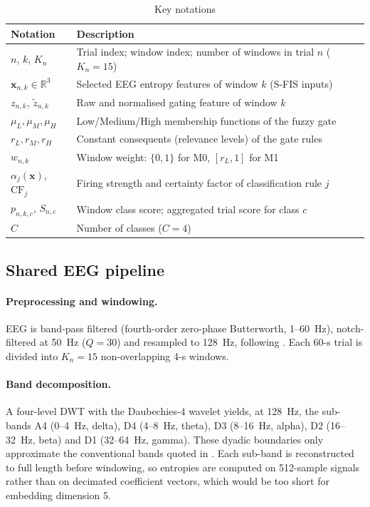 \documentclass[11pt,a4paper]{article}
\begin{document}
\begin{table}[t]
\centering\small
\caption{Key notations}\label{tab:notation}
\begin{tabular}{@{}ll@{}}
\toprule
Notation & Description\\
\midrule
$n$, $k$, $K_n$ & Trial index; window index; number of windows in trial $n$ ($K_n=15$)\\
$\mathbf{x}_{n,k}\in\mathbb{R}^{3}$ & Selected EEG entropy features of window $k$ (S-FIS inputs)\\
$z_{n,k}$, $\tilde z_{n,k}$ & Raw and normalised gating feature of window $k$\\
$\mu_{L},\mu_{M},\mu_{H}$ & Low/Medium/High membership functions of the fuzzy gate\\
$r_{L},r_{M},r_{H}$ & Constant consequents (relevance levels) of the gate rules\\
$w_{n,k}$ & Window weight: $\{0,1\}$ for M0, $[r_L,1]$ for M1\\
$\alpha_j(\mathbf{x})$, $\mathrm{CF}_j$ & Firing strength and certainty factor of classification rule $j$\\
$p_{n,k,c}$, $S_{n,c}$ & Window class score; aggregated trial score for class $c$\\
$C$ & Number of classes ($C=4$)\\
\bottomrule
\end{tabular}
\end{table}

\subsection{Shared EEG pipeline}
\paragraph{Preprocessing and windowing.} EEG is band-pass filtered (fourth-order zero-phase Butterworth, 1--60~Hz), notch-filtered at 50~Hz ($Q=30$) and resampled to 128~Hz, following \cite{FarhadiSedehi2024a}. Each 60-s trial is divided into $K_n=15$ non-overlapping 4-s windows.

\paragraph{Band decomposition.} A four-level DWT with the Daubechies-4 wavelet \cite{Mallat1989} yields, at 128~Hz, the sub-bands A4 (0--4~Hz, delta), D4 (4--8~Hz, theta), D3 (8--16~Hz, alpha), D2 (16--32~Hz, beta) and D1 (32--64~Hz, gamma). These dyadic boundaries only approximate the conventional bands quoted in \cite{FarhadiSedehi2024a}. Each sub-band is reconstructed to full length before windowing, so entropies are computed on 512-sample signals rather than on decimated coefficient vectors, which would be too short for embedding dimension 5.
\end{document}
